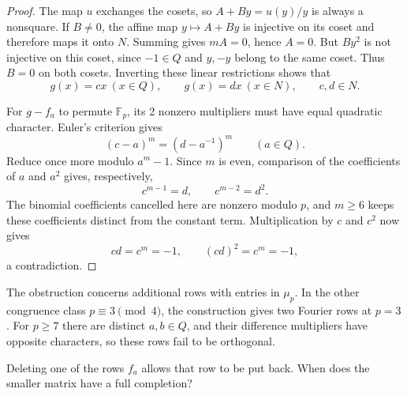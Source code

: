 \documentclass[11pt,a4paper]{article}
\numberwithin{equation}{section}
\begin{document}
\begin{proof}
The map $u$ exchanges the cosets, so $A+By=u(y)/y$ is always a nonsquare. If $B\ne0$, the affine map $y\mapsto A+By$ is injective on its coset and therefore maps it onto $N$. Summing gives $mA=0$, hence $A=0$. But $By^2$ is not injective on this coset, since $-1\in Q$ and $y,-y$ belong to the same coset. Thus $B=0$ on both cosets. Inverting these linear restrictions shows that
$$g(x)=cx\ (x\in Q),\qquad g(x)=dx\ (x\in N),\qquad c,d\in N.$$

For $g-f_a$ to permute $\mathbb F_p$, its 2 nonzero multipliers must have equal quadratic character. Euler's criterion gives
$$(c-a)^m=(d-a^{-1})^m\qquad(a\in Q).$$
Reduce once more modulo $a^m-1$. Since $m$ is even, comparison of the coefficients of $a$ and $a^2$ gives, respectively,
$$c^{m-1}=d,\qquad c^{m-2}=d^2.$$
The binomial coefficients cancelled here are nonzero modulo $p$, and $m\ge6$ keeps these coefficients distinct from the constant term. Multiplication by $c$ and $c^2$ now gives
$$cd=c^m=-1,\qquad (cd)^2=c^m=-1,$$
a contradiction.
\end{proof}

The obstruction concerns additional rows with entries in $\mu_p$. In the other congruence class $p\equiv3\pmod4$, the construction gives two Fourier rows at $p=3$. For $p\ge7$ there are distinct $a,b\in Q$, and their difference multipliers have opposite characters, so these rows fail to be orthogonal.

Deleting one of the rows $f_a$ allows that row to be put back. When does the smaller matrix have a full completion?
\end{document}
